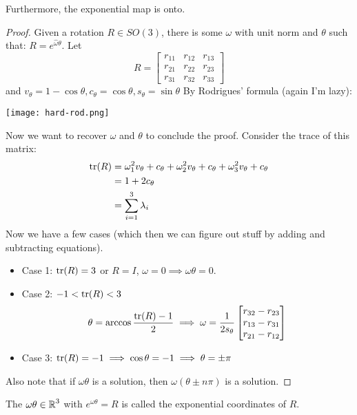 Furthermore, the exponential map is onto.
\begin{proof}
    Given a rotation $R \in SO(3)$, there is some $\omega$ with unit norm and $\theta$ such that:
    $R = e^{\hat{\omega} \theta}$. Let
    \[ R = \begin{bmatrix}
        r_{11} & r_{12} & r_{13} \\
        r_{21} & r_{22} & r_{23} \\
        r_{31} & r_{32} & r_{33}
    \end{bmatrix} \]
    and $v_{\theta} = 1 - \cos \theta, c_{\theta} = \cos \theta, s_{\theta} = \sin \theta$
    By Rodrigues' formula (again I'm lazy):
    
    \texttt{[image: hard-rod.png]}

    Now we want to recover $\omega$ and $\theta$ to conclude the proof. Consider the trace of this matrix:
    \begin{align*}
        \tr(R) &= \omega_1^2 v_{\theta} + c_{\theta} + \omega_2^2 v_{\theta} + c_{\theta} + \omega_3^2 v_{\theta} + c_{\theta} \\
        &= 1 + 2 c_{\theta} \\
        &= \sum_{i = 1}^3 \lambda_i
    \end{align*}
    Now we have a few cases (which then we can figure out stuff by adding and subtracting equations).
    \begin{itemize}
        \item Case 1: $\tr(R) = 3$ or $R = I$, $\omega = 0 \implies \omega \theta = 0$.
        \item Case 2: $-1 < \tr(R) < 3$
        \[ \theta = \arccos \frac{\tr(R) - 1}{2} \implies \omega = \frac{1}{2 s_{\theta}} \begin{bmatrix}
            r_{32} - r_{23} \\
            r_{13} - r_{31} \\
            r_{21} - r_{12}
        \end{bmatrix} \]
        \item Case 3: $\tr(R) = -1 \implies \cos \theta = -1 \implies \theta = \pm \pi$
    \end{itemize}

    Also note that if $\omega \theta$ is a solution, then $\omega(\theta \pm n \pi)$ is a solution.
\end{proof}

\begin{definition} 
    The $\omega \theta \in \operatorname{\mathbb{R}}^3$ with $e^{\hat{\omega} \theta} = R$
    is called the exponential coordinates of $R$.
\end{definition}

